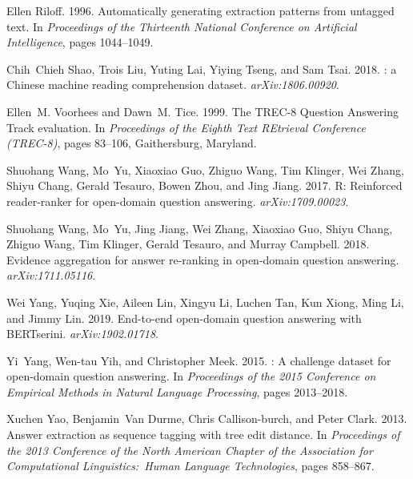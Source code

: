 \documentclass[11pt,a4paper]{article}
\begin{document}
\begin{thebibliography}{24}
Ellen Riloff. 1996.
\newblock Automatically generating extraction patterns from untagged text.
\newblock In \emph{Proceedings of the Thirteenth National Conference on
  Artificial Intelligence}, pages 1044--1049.

Chih~Chieh Shao, Trois Liu, Yuting Lai, Yiying Tseng, and Sam Tsai. 2018.
: a {Chinese} machine reading comprehension dataset.
\newblock \emph{arXiv:1806.00920}.

Ellen~M. Voorhees and Dawn~M. Tice. 1999.
\newblock The {TREC}-8 {Question} {Answering} {Track} evaluation.
\newblock In \emph{Proceedings of the Eighth Text REtrieval Conference
  (TREC-8)}, pages 83--106, Gaithersburg, Maryland.

Shuohang Wang, Mo~Yu, Xiaoxiao Guo, Zhiguo Wang, Tim Klinger, Wei Zhang, Shiyu
  Chang, Gerald Tesauro, Bowen Zhou, and Jing Jiang. 2017.
\newblock R: Reinforced reader-ranker for open-domain question answering.
\newblock \emph{arXiv:1709.00023}.

Shuohang Wang, Mo~Yu, Jing Jiang, Wei Zhang, Xiaoxiao Guo, Shiyu Chang, Zhiguo
  Wang, Tim Klinger, Gerald Tesauro, and Murray Campbell. 2018.
\newblock Evidence aggregation for answer re-ranking in open-domain question
  answering.
\newblock \emph{arXiv:1711.05116}.

Wei Yang, Yuqing Xie, Aileen Lin, Xingyu Li, Luchen Tan, Kun Xiong, Ming Li,
  and Jimmy Lin. 2019.
\newblock End-to-end open-domain question answering with {BERTserini}.
\newblock \emph{arXiv:1902.01718}.

Yi~Yang, Wen-tau Yih, and Christopher Meek. 2015.
: A challenge dataset for open-domain question answering.
\newblock In \emph{Proceedings of the 2015 Conference on Empirical Methods in
  Natural Language Processing}, pages 2013--2018.

Xuchen Yao, Benjamin~Van Durme, Chris Callison-burch, and Peter Clark. 2013.
\newblock Answer extraction as sequence tagging with tree edit distance.
\newblock In \emph{Proceedings of the 2013 Conference of the North American
  Chapter of the Association for Computational Linguistics:\ Human Language
  Technologies}, pages 858--867.


\end{thebibliography}
\end{document}
